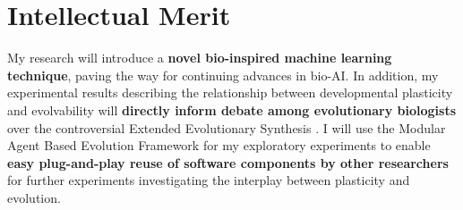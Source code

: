 \section{Intellectual Merit}
My research will introduce a \textbf{novel bio-inspired machine learning technique}, paving the way for continuing advances in bio-AI.
In addition, my experimental results describing the relationship between developmental plasticity and evolvability will \textbf{directly inform debate among evolutionary biologists} over the controversial Extended Evolutionary Synthesis \cite{Laland2014DoesRethink}.
I will use the Modular Agent Based Evolution Framework \cite{Hintze2017Mabe} for my exploratory experiments to enable \textbf{easy plug-and-play reuse of software components by other researchers} for further experiments investigating the interplay between plasticity and evolution.

